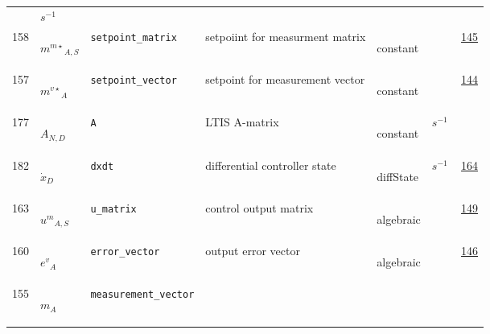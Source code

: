 \begin{longtable}{|p{1cm}|p{2.5cm}|p{4.5cm}|p{8cm}|p{3.0cm}|p{3cm}|p{1cm}|}
             & $ s^{-1} \, $
             & \\
            158
             & \hypertarget{"v:158"}{ $ {{m^{m\star}}}{_{A, S}} $}
             & \verb|setpoint_matrix|
             & setpoiint for measurment matrix
             & \begin{lay}constant \end{lay}
             & $  $
             &                 \hyperlink{"e:145"}{ 145 }
                 \\
            157
             & \hypertarget{"v:157"}{ $ {{m^{v\star}}}{_{A}} $}
             & \verb|setpoint_vector|
             & setpoint for measurement vector
             & \begin{lay}constant \end{lay}
             & $  $
             &                 \hyperlink{"e:144"}{ 144 }
                 \\
            177
             & \hypertarget{"v:177"}{ $ {A}{_{N, D}} $}
             & \verb|A|
             & LTIS A-matrix 
             & \begin{lay}constant \end{lay}
             & $ s^{-1} \, $
             & \\
            182
             & \hypertarget{"v:182"}{ $ {{\dot{x}}}{_{D}} $}
             & \verb|dxdt|
             & differential controller state
             & \begin{lay}diffState \end{lay}
             & $ s^{-1} \, $
             &                 \hyperlink{"e:164"}{ 164 }
                 \\
            163
             & \hypertarget{"v:163"}{ $ {{u^{m}}}{_{A, S}} $}
             & \verb|u_matrix|
             & control output matrix
             & \begin{lay}algebraic \end{lay}
             & $  $
             &                 \hyperlink{"e:149"}{ 149 }
                 \\
            160
             & \hypertarget{"v:160"}{ $ {{e^{v}}}{_{A}} $}
             & \verb|error_vector|
             & output error vector
             & \begin{lay}algebraic \end{lay}
             & $  $
             &                 \hyperlink{"e:146"}{ 146 }
                 \\
            155
             & \hypertarget{"v:155"}{ $ {m}{_{A}} $}
             & \verb|measurement_vector|

\end{longtable}
